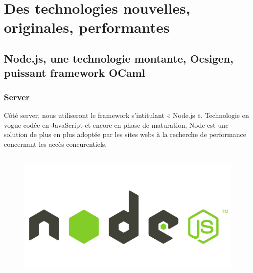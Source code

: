\documentclass{life-fr}
\begin{document}

\chapter{Des technologies nouvelles, originales, performantes}

\section{Node.js, une technologie montante, Ocsigen, puissant framework OCaml}

\subsection{Server}

Côté server, nous utiliseront le framework s'intitulant « Node.js ». Technologie en vogue codée en JavaScript et encore en phase de maturation, Node est une solution de plus en plus adoptée par les sites webs à la recherche de performance concernant les accès concurentiels.\\
\\

\begin{figure}[H]
  \begin{center}
    \includegraphics[width=13cm]{img/nodejs.png}
  \end{center}
\end{figure}
\end{document}
